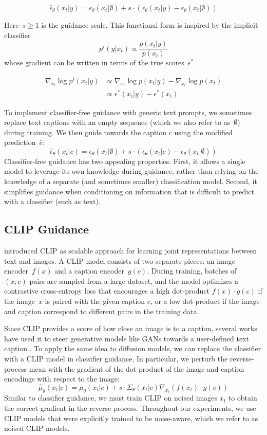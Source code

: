 $$\hat{\epsilon}_{\theta}(x_t|y) = \epsilon_{\theta}(x_t|\emptyset) + s \cdot (\epsilon_{\theta}(x_t|y) - \epsilon_{\theta}(x_t|\emptyset))$$

Here~$s \ge 1$ is the guidance scale. This functional form is inspired by the implicit classifier $$p^{i}(y|x_t) \propto \frac{p(x_t|y)}{p(x_t)}$$ whose gradient can be written in terms of the true scores~$\epsilon^{*}$

\begin{align*}
\nabla_{x_t} \log p^{i}(x_t|y) &\propto \nabla_{x_t} \log p(x_t|y) - \nabla_{x_t} \log p(x_t) \\
&\propto \epsilon^{*}(x_t|y) - \epsilon^{*}(x_t)    
\end{align*}

To implement classifier-free guidance with generic text prompts, we sometimes replace text captions with an empty sequence (which we also refer to as~$\emptyset$) during training. We then guide towards the caption $c$ using the modified prediction~$\hat{\epsilon}$:
$$\hat{\epsilon}_{\theta}(x_t|c) = \epsilon_{\theta}(x_t|\emptyset) + s \cdot (\epsilon_{\theta}(x_t|c) - \epsilon_{\theta}(x_t|\emptyset))$$
Classifier-free guidance has two appealing properties. First, it allows a single model to leverage its own knowledge during guidance, rather than relying on the knowledge of a separate (and sometimes smaller) classification model. Second, it simplifies guidance when conditioning on information that is difficult to predict with a classifier (such as text).

\subsection{CLIP Guidance}
\label{sec:clip}

\citet{clip} introduced CLIP as scalable approach for learning joint representations between text and images. A CLIP model consists of two separate pieces: an image encoder~$f(x)$ and a caption encoder~$g(c)$. During training, batches of~$(x, c)$ pairs are sampled from a large dataset, and the model optimizes a contrastive cross-entropy loss that encourages a high dot-product $f(x) \cdot g(c)$ if the image~$x$ is paired with the given caption $c$, or a low dot-product if the image and caption correspond to different pairs in the training data.

Since CLIP provides a score of how close an image is to a caption, several works have used it to steer generative models like GANs towards a user-defined text caption \cite{clipglass,styleclip,bigsleep,stylegannada}. To apply the same idea to diffusion models, we can replace the classifier with a CLIP model in classifier guidance. In particular, we perturb the reverse-process mean with the gradient of the dot product of the image and caption encodings with respect to the image:
$$\hat{\mu}_{\theta}(x_t|c) = \mu_{\theta}(x_t|c) + s \cdot \Sigma_{\theta}(x_t|c) \nabla_{x_t} \left(f(x_t) \cdot g(c) \right)$$
Similar to classifier guidance, we must train CLIP on noised images $x_t$ to obtain the correct gradient in the reverse process. Throughout our experiments, we use CLIP models that were explicitly trained to be noise-aware, which we refer to as noised CLIP models.


